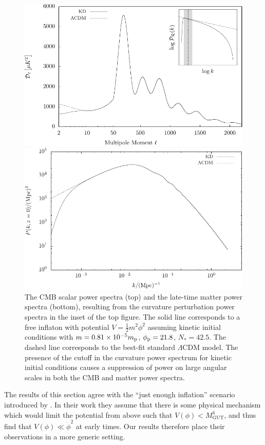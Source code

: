 %
\begin{figure}[ht]
  \centerline{\includegraphics[width=\textwidth]{chapter_kinetic_dominance/figures/Cl}}
  \centerline{\includegraphics[width=\textwidth]{chapter_kinetic_dominance/figures/matter}}
  \caption{The CMB scalar power spectra (top) and the late-time matter power spectra (bottom), resulting from the curvature perturbation power spectra in the inset of the top figure. The solid line corresponds to a free inflaton with potential $V=\frac{1}{2}m^2\phi^2$ assuming kinetic initial conditions with $m=0.81\times10^{-5}m_{\mathrm{p}}$, $\phi_{\mathrm{p}} = 21.8$, $N_*=42.5$. The dashed line corresponds to the best-fit standard $\Lambda$CDM model.  The presence of the cutoff in the curvature power spectrum for kinetic initial conditions causes a suppression of power on large angular scales in both the CMB and matter power spectra.\label{fig:figure_Cl}}
\end{figure}
%
The results of this section agree with the ``just enough inflation'' scenario introduced by \citet{Ramirez_excluded_2009,Ramirez_predictions_2012,Ramirez_low_2012}.  In their work they assume that there is some physical mechanism which would limit the potential from above such that $V(\phi)<M_\mathrm{GUT}^4$, and thus find that $V(\phi)\ll\dot{\phi}^2$ at early times. Our results therefore place their observations in a more generic setting.


